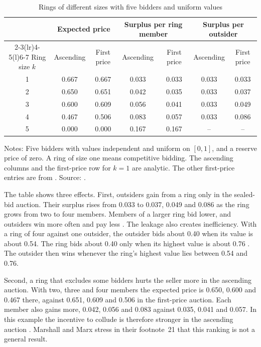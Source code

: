\begin{table}[htbp]
\centering
\caption{Rings of different sizes with five bidders and uniform values}\label{tab:14-mm-ring}
\begin{tabular}{@{}ccccccc@{}}
\toprule
& \multicolumn{2}{c}{Expected price} & \multicolumn{2}{c}{Surplus per ring member} & \multicolumn{2}{c}{Surplus per outsider}\\
\cmidrule(lr){2-3}\cmidrule(lr){4-5}\cmidrule(l){6-7}
Ring size $k$ & Ascending & First price & Ascending & First price & Ascending & First price\\
\midrule
1 & 0.667 & 0.667 & 0.033 & 0.033 & 0.033 & 0.033\\
2 & 0.650 & 0.651 & 0.042 & 0.035 & 0.033 & 0.037\\
3 & 0.600 & 0.609 & 0.056 & 0.041 & 0.033 & 0.049\\
4 & 0.467 & 0.506 & 0.083 & 0.057 & 0.033 & 0.086\\
5 & 0.000 & 0.000 & 0.167 & 0.167 & -- & --\\
\bottomrule
\end{tabular}

\smallskip
\begin{minipage}{0.95\textwidth}
\footnotesize Notes: Five bidders with values independent and uniform on $[0,1]$, and a reserve price
of zero. A ring of size one means competitive bidding. The ascending columns and the first-price row
for $k=1$ are analytic. The other first-price entries are from \citet[Table~III]{MarshallEtAl1994}.
Source: \citet[ch.~8, Table~8.1, p.~182]{MarshallMarx2012}.
\end{minipage}
\end{table}

The table shows three effects. First, outsiders gain from a ring only in the sealed-bid auction. Their
surplus rises from 0.033 to 0.037, 0.049 and 0.086 as the ring grows from two to four members. Members
of a larger ring bid lower, and outsiders win more often and pay less \citep[p.~181]{MarshallMarx2012}.
The leakage also creates inefficiency. With a ring of four against one outsider, the outsider bids
about 0.40 when its value is about 0.54. The ring bids about 0.40 only when its highest value is about
0.76 \citep[pp.~183--184, using Figure~2 of \citealp{MarshallEtAl1994}]{MarshallMarx2012}. The outsider
then wins whenever the ring's highest value lies between 0.54 and 0.76.

Second, a ring that excludes some bidders hurts the seller more in the ascending auction. With two,
three and four members the expected price is 0.650, 0.600 and 0.467 there, against 0.651, 0.609 and
0.506 in the first-price auction. Each member also gains more, 0.042, 0.056 and 0.083 against 0.035,
0.041 and 0.057. In this example the incentive to collude is therefore stronger in the ascending auction
\citep[p.~181]{MarshallMarx2012}. Marshall and Marx stress in their footnote~21 that this ranking is not
a general result.

